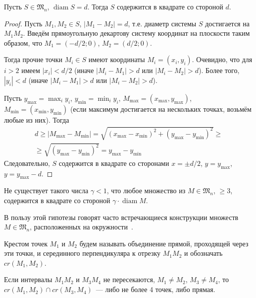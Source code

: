 \begin{lemma}
	\label{lemma:square_container}
	Пусть $S\in\mathfrak{M}_n$, $\operatorname{diam} S = d$.
	Тогда $S$ содержится в квадрате со стороной $d$.
\end{lemma}

\begin{proof}
	Пусть $M_1, M_2 \in S$, $|M_1 - M_2| = d$,
	т.е. диаметр системы $S$ достигается на $M_1 M_2$.
	Введём прямоугольную декартову систему координат на плоскости таким образом, что
	$M_1 = (-d/2; 0)$, $M_2 = (d/2; 0)$.

	Тогда прочие точки $M_i \in S$ имеют координаты $M_i=(x_i, y_i)$.
	Очевидно, что для $i>2$ имеем $|x_i| < d/2$
	(иначе $|M_i - M_1| > d$ или $|M_i - M_2| > d$).
	Более того, $|y_i| < d$ (иначе $|M_i - M_1| > d$ или $|M_i - M_2| > d$).

	Пусть $y_{\max} = \max_{i} y_i$, $y_{\min} = \min_{i} y_i$, $M_{\max}=(x_{\max}, y_{\max})$, $M_{\min}=(x_{\min}, y_{\min})$
	(если максимум достигается на нескольких точках, возьмём любые из них).
	Тогда
	\begin{multline}
		d \geq |M_{\max} - M_{\min}| = \sqrt{(x_{\max} - x_{\min})^2 + (y_{\max} - y_{\min})^2}
		\geq
		\\\geq
		\sqrt{(y_{\max} - y_{\min})^2} =
		y_{\max} - y_{\min}
	\end{multline}
	Следовательно, $S$ содержится в квадрате со сторонами $x=\pm d/2$,
	$y=y_{\max}$, $y=y_{\max} - d$.
\end{proof}

\begin{hypothesis}
	Не существует такого числа $\gamma < 1$,
	что любое множество из $M\in \mathfrak{M}_n$, $\geq 3$,
	содержится в квадрате со стороной $\gamma \cdot \operatorname{diam} M$.
\end{hypothesis}

В пользу этой гипотезы говорят часто встречающиеся конструкции множеств $M\in\mathfrak{M}_n$,
расположенных на окружности~\cite{anning1915discussions,harborth1993upper,piepmeyer1996maximum,kurz2008bounds,our-vvmsh-2018}.

\begin{definition}
	Крестом точек $M_1$ и $M_2$ будем называть объединение прямой,
	проходящей через эти точки,
	и серединного перпендикуляра к отрезку $M_1 M_2$
	и обозначать $cr(M_1,M_2)$.
\end{definition}

\begin{proposition}
	\label{proposition:intervals_cross}
	Если интервалы $M_1 M_2$ и $M_3 M_4$ не пересекаются,
	$M_1 \neq M_2$, $M_3 \neq M_4$,
	то $cr(M_1,M_2) \cap cr(M_3,M_4)$~--- либо не более 4 точек, либо прямая.
\end{proposition}

